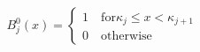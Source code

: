 \documentclass[preview]{standalone}
\begin{document}
\begin{align*}
B_j^0(x) = \begin{cases} 1 \quad \text{for} \kappa_j \le x < \kappa_{j+1} \\ 0 \quad \text{otherwise} \end{cases}
\end{align*}
\end{document}
